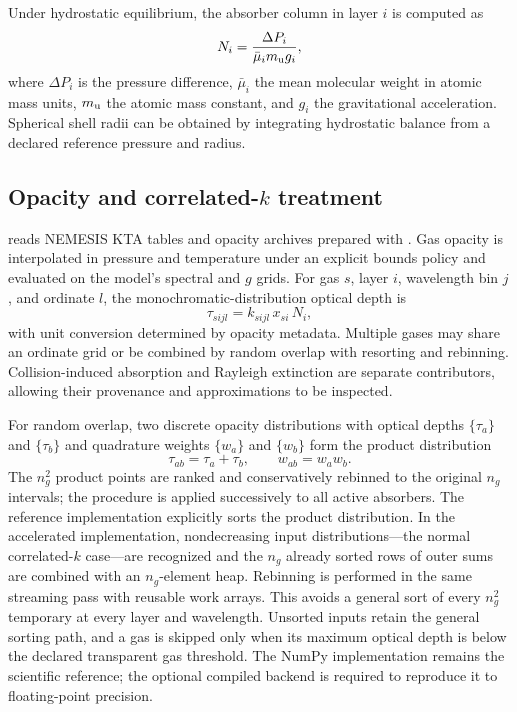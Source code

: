 Under hydrostatic equilibrium, the absorber column in layer $i$ is computed as
\begin{equation}
 N_i = \frac{\Delta P_i}{\bar{\mu}_i m_{\rm u} g_i},
 \label{eq:column}
\end{equation}
where $\Delta P_i$ is the pressure difference, $\bar{\mu}_i$ the mean molecular
weight in atomic mass units, $m_{\rm u}$ the atomic mass constant, and $g_i$
the gravitational acceleration. Spherical shell radii can be obtained by
integrating hydrostatic balance from a declared reference pressure and radius.

\subsection{Opacity and correlated-$k$ treatment}

\ROBERT{} reads NEMESIS KTA tables and opacity archives prepared with
 \citep{Leconte2021}. Gas opacity is interpolated in pressure and
temperature under an explicit bounds policy and evaluated on the model's
spectral and $g$ grids. For gas $s$, layer $i$, wavelength bin $j$, and ordinate
$l$, the monochromatic-distribution optical depth is
\begin{equation}
 \tau_{sijl}=k_{sijl}\,x_{si}\,N_i,
 \label{eq:tau}
\end{equation}
with unit conversion determined by opacity metadata. Multiple gases may share
an ordinate grid or be combined by random overlap with resorting and
rebinning. Collision-induced absorption and Rayleigh extinction are separate
contributors, allowing their provenance and approximations to be inspected.

For random overlap, two discrete opacity distributions with optical depths
$\{\tau_a\}$ and $\{\tau_b\}$ and quadrature weights $\{w_a\}$ and $\{w_b\}$
form the product distribution
\begin{equation}
 \tau_{ab}=\tau_a+\tau_b, \qquad w_{ab}=w_aw_b.
 \label{eq:random-overlap}
\end{equation}
The $n_g^2$ product points are ranked and conservatively rebinned to the
original $n_g$ intervals; the procedure is applied successively to all active
absorbers. The reference implementation explicitly sorts the product
distribution. In the accelerated implementation, nondecreasing input
distributions---the normal correlated-$k$ case---are recognized and the
$n_g$ already sorted rows of outer sums are combined with an $n_g$-element
heap. Rebinning is performed in the same streaming pass with reusable work
arrays. This avoids a general sort of every $n_g^2$ temporary at every layer
and wavelength. Unsorted inputs retain the general sorting path, and a gas is
skipped only when its maximum optical depth is below the declared transparent
gas threshold. The NumPy implementation remains the scientific reference;
the optional compiled backend is required to reproduce it to floating-point
precision.

